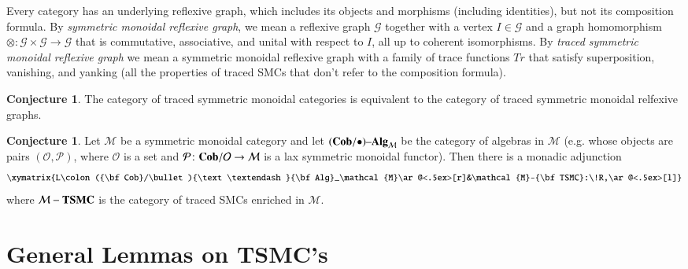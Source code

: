 \documentclass{amsart}
\def\mc{\mathcal}
\def\to{\rightarrow}
\def\taking{\colon}
\def\Cob{{\bf Cob}}
\def\alg{{\text \textendash}{\bf Alg}}
\def\mcG{\mc{G}}
\def\mcM{\mc{M}}
\def\mcO{\mc{O}}
\def\mcP{\mc{P}}
\def\TSMC{{\bf TSMC}}
\theoremstyle{remark}
\theoremstyle{definition}
\newtheorem{conjecture}[subsection]{Conjecture}
\begin{document}
Every category has an underlying reflexive graph, which includes its objects and morphisms (including identities), but not its composition formula. By {\em symmetric monoidal reflexive graph}, we mean a reflexive graph $\mcG$ together with a vertex $I\in \mcG$ and a graph homomorphism $\otimes\taking\mcG\times\mcG\to\mcG$ that is commutative, associative, and unital with respect to $I$, all up to coherent isomorphisms. By {\em traced symmetric monoidal reflexive graph} we mean a symmetric monoidal reflexive graph with a family of trace functions $Tr$ that satisfy superposition, vanishing, and yanking (all the properties of traced SMCs that don't refer to the composition formula).

\begin{conjecture}
The category of traced symmetric monoidal categories is equivalent to the category of traced symmetric monoidal relfexive graphs.
\end{conjecture}

\begin{conjecture}
Let $\mcM$ be a symmetric monoidal category and let $(\Cob/\bullet)\alg_\mcM$ be the category of algebras in $\mcM$ (e.g. whose objects are pairs $(\mcO,\mcP)$, where $\mcO$ is a set and $\mcP\taking\Cob/\mcO\to\mcM$ is a lax symmetric monoidal functor). Then there is a monadic adjunction 
$$\xymatrix{L\taking(\Cob/\bullet)\alg_\mcM\ar@<.5ex>[r]&\mcM-\TSMC:\!R,\ar@<.5ex>[l]}$$
where $\mcM-\TSMC$ is the category of traced SMCs enriched in $\mcM$.
\end{conjecture}

\section{General Lemmas on TSMC's}
\end{document}
